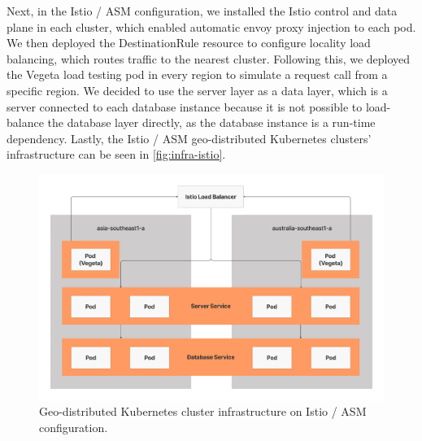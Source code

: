 
Next, in the Istio / ASM configuration, we installed the Istio control and data plane in each cluster, which enabled automatic envoy proxy injection to each pod. We then deployed the DestinationRule resource to configure locality load balancing, which routes traffic to the nearest cluster. Following this, we deployed the Vegeta load testing pod in every region to simulate a request call from a specific region. We decided to use the server layer as a data layer, which is a server connected to each database instance because it is not possible to load-balance the database layer directly, as the database instance is a run-time dependency. Lastly, the Istio / ASM geo-distributed Kubernetes clusters' infrastructure can be seen in \autoref{fig:infra-istio}.


\begin{figure}
	\centering
	\includegraphics[width=1\textwidth]{assets/diagrams/infra-istio.png}
	\caption{Geo-distributed Kubernetes cluster infrastructure on Istio / ASM configuration.}
	\label{fig:infra-istio}
\end{figure}

